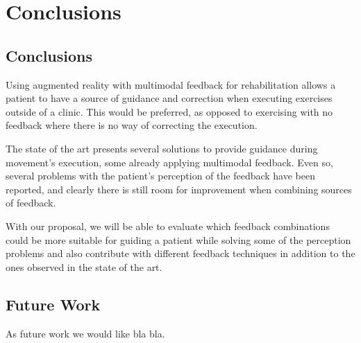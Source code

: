 \chapter{Conclusions}
\label{sec:conclusions}

\section{Conclusions}
Using augmented reality with multimodal feedback for rehabilitation allows a 
patient to have a source of guidance and correction when executing 
exercises outside of a clinic. This would be preferred, as opposed to exercising with no feedback where there is no way of correcting the execution.

The state of the art presents several solutions to provide guidance during movement's execution, some already applying multimodal feedback. 
Even so, several problems with the patient's perception of the feedback have been reported, and clearly there is still room for improvement when combining sources of feedback.

With our proposal, we will be able to evaluate which feedback 
combinations could be more suitable for guiding a patient while solving some of the perception problems and also 
contribute with different feedback techniques in addition to the ones observed in the state of the art.

\section{Future Work}

As future work we would like bla bla.